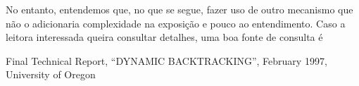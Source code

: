 \documentclass{article}
\begin{document}
No entanto, entendemos que, no que se segue, fazer uso de outro mecanismo que não o
 adicionaria complexidade na exposição e pouco  ao
entendimento. Caso a leitora interessada queira consultar detalhes, uma boa fonte de consulta é
\cite{dyn}




  \begin{thebibliography}{2}

    Final Technical Report,
    ``DYNAMIC BACKTRACKING'',
    February 1997,
    University of Oregon


  \end{thebibliography}
\end{document}
